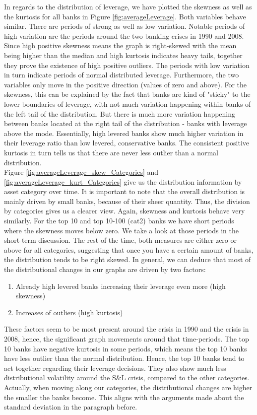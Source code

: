\documentclass[12pt, a4paper]{article} %
\begin{document}
In regards to the distribution of leverage, we have plotted the skewness as well as the kurtosis for all banks in Figure \ref{fig:averageLeverage}. Both variables behave similar. There are periods of strong as well as low variation. Notable periods of high variation are the periods around the two banking crises in 1990 and 2008. Since high positive skewness means the graph is right-skewed with the mean being higher than the median and high kurtosis indicates heavy tails, together they prove the existence of high positive outliers. The periods with low variation in turn indicate periods of normal distributed leverage. Furthermore, the two variables only move in the positive direction (values of zero and above). For the skewness, this can be explained by the fact that banks are kind of "sticky" to the lower boundaries of leverage, with not much variation happening within banks of the left tail of the distribution. But there is much more variation happening between banks located at the right tail of the distribution - banks with leverage above the mode. Essentially, high levered banks show much higher variation in their leverage ratio than low levered, conservative banks. The consistent positive kurtosis in turn tells us that there are never less outlier than a normal distribution.\\
Figure \ref{fig:averageLeverage_skew_Categories} and \ref{fig:averageLeverage_kurt_Categories} give us the distribution information by asset category over time. It is important to note that the overall distribution is mainly driven by small banks, because of their sheer quantity. Thus, the division by categories gives us a clearer view. Again, skewness and kurtosis behave very similarly. For the top 10 and top 10-100 (cat2) banks we have short periods where the skewness moves below zero. We take a look at those periods in the short-term discussion. The rest of the time, both measures are either zero or above for all categories, suggesting that once you have a certain amount of banks, the distribution tends to be right skewed. 
In general, we can deduce that most of the distributional changes in our graphs are driven by two factors:
\begin{enumerate}
\item Already high levered banks increasing their leverage even more (high skewness)
\item Increases of outliers (high kurtosis)
\end{enumerate}
These factors seem to be most present around the crisis in 1990 and the crisis in 2008, hence, the significant graph movements around that time-periods.
The top 10 banks have negative kurtosis in some periods, which means the top 10 banks have less outlier than the normal distribution. Hence, the top 10 banks tend to act together regarding their leverage decisions. 
They also show much less distributional volatility around the S\&L crisis, compared to the other categories. Actually, when moving along our categories, the distributional changes are higher the smaller the banks become. This aligns with the arguments made about the standard deviation in the paragraph before.
\end{document}
